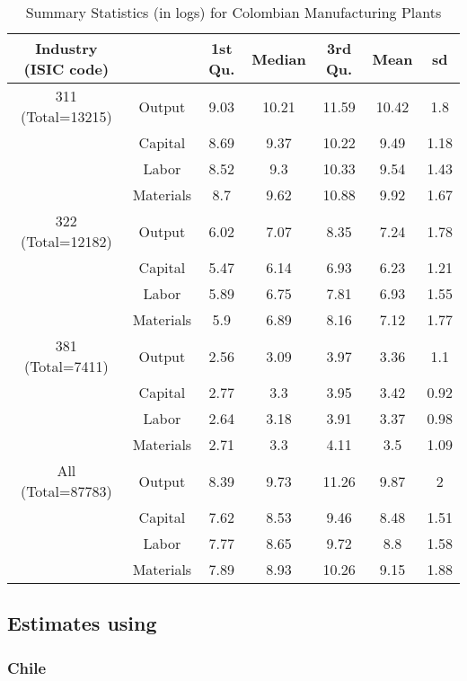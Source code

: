 \documentclass[11pt]{article}
\begin{document}
\begin{table}[H]
\centering
\caption{Summary Statistics (in logs) for Colombian Manufacturing Plants}
\begin{tabular}{ccccccc}
  \hline\hline Industry (ISIC code) &   & 1st Qu. & Median & 3rd Qu. & Mean & sd \\ 
  \hline
311 (Total=13215) & Output & 9.03 & 10.21 & 11.59 & 10.42 & 1.8 \\ 
   & Capital & 8.69 & 9.37 & 10.22 & 9.49 & 1.18 \\ 
   & Labor & 8.52 & 9.3 & 10.33 & 9.54 & 1.43 \\ 
   & Materials & 8.7 & 9.62 & 10.88 & 9.92 & 1.67 \\ 
  322 (Total=12182) & Output & 6.02 & 7.07 & 8.35 & 7.24 & 1.78 \\ 
   & Capital & 5.47 & 6.14 & 6.93 & 6.23 & 1.21 \\ 
   & Labor & 5.89 & 6.75 & 7.81 & 6.93 & 1.55 \\ 
   & Materials & 5.9 & 6.89 & 8.16 & 7.12 & 1.77 \\ 
  381 (Total=7411) & Output & 2.56 & 3.09 & 3.97 & 3.36 & 1.1 \\ 
   & Capital & 2.77 & 3.3 & 3.95 & 3.42 & 0.92 \\ 
   & Labor & 2.64 & 3.18 & 3.91 & 3.37 & 0.98 \\ 
   & Materials & 2.71 & 3.3 & 4.11 & 3.5 & 1.09 \\ 
  All (Total=87783) & Output & 8.39 & 9.73 & 11.26 & 9.87 & 2 \\ 
   & Capital & 7.62 & 8.53 & 9.46 & 8.48 & 1.51 \\ 
   & Labor & 7.77 & 8.65 & 9.72 & 8.8 & 1.58 \\ 
   & Materials & 7.89 & 8.93 & 10.26 & 9.15 & 1.88 \\ 
   \hline
\end{tabular}
\label{COLsum}
\end{table}

\subsection{Estimates using \cite{Levinsohn2003}}

\subsubsection{Chile}
\end{document}
